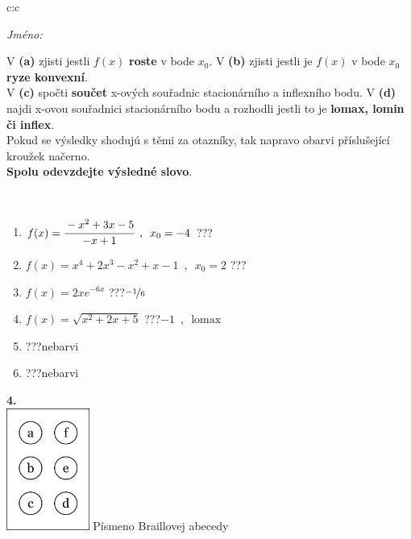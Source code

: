 \documentclass[10pt]{report}
\begin{document}
\begin{tabular}{c:c}
\begin{minipage}[c][104.5mm][t]{0.5\linewidth}
\begin{center}
\textit{Jméno:}\phantom{xxxxxxxxxxxxxxxxxxxxxxxxxxxxxxxxxxxxxxxxxxxxxxxxxxxxxxxxxxxxxxxxx}\\[5mm]
\begin{minipage}{0.95\linewidth}
\begin{center}
{\small V \textbf{(a)} zjisti jestli $f(x)$ \textbf{roste} v bode $x_0$. V \textbf{(b)} zjisti jestli je $f(x)$ v bode $x_0$ \textbf{ryze konvexní}.\\V \textbf{(c)} spočti \textbf{součet} x-ových souřadnic stacionárního a inflexního bodu. V \textbf{(d)} najdi x-ovou souřadnici stacionárního bodu a rozhodli jestli to je \textbf{lomax, lomin či inflex}.\\Pokud se výsledky shodujú s těmi za otazníky, tak napravo obarvi příslušející kroužek načerno.\\\textbf{Spolu odevzdejte výsledné slovo}}.
\end{center}
\end{minipage}
\\[1mm]
\begin{minipage}{0.79\linewidth}
\begin{center}
\begin{varwidth}{\linewidth}
\begin{enumerate}
\normalsize
\item $f(x)=\cfrac{-x^2+3x-5}{-x+1}\enspace , \enspace x_0=-4$\quad \dotfill\; ???\;\dotfill \quad {}
\item $f(x)=x^4+2x^3-x^2+x-1\enspace , \enspace x_0=2$\quad \dotfill\; ???\;\dotfill \quad {}
\item $f(x)=2xe^{-6x}$\quad \dotfill\; ???\;\dotfill \quad $\nicefrac{-1}{6}$
\item $f(x)=\sqrt{x^2+2x+5}$\quad \dotfill\; ???\;\dotfill \quad $-1\enspace , \enspace\mathrm{lomax}$
\item \quad \dotfill\; ???\;\dotfill \quad nebarvi
\item \quad \dotfill\; ???\;\dotfill \quad nebarvi
\end{enumerate}
\end{varwidth}
\end{center}
\end{minipage}
\begin{minipage}{0.20\linewidth}
\begin{center}
{\Huge\bfseries 4.} \\[2mm]
\includegraphics[height=40mm]{../images/braille.png}
{\small Písmeno Braillovej abecedy}
\end{center}
\end{minipage}
\end{center}
\end{minipage}
%
\end{tabular}
\end{document}
